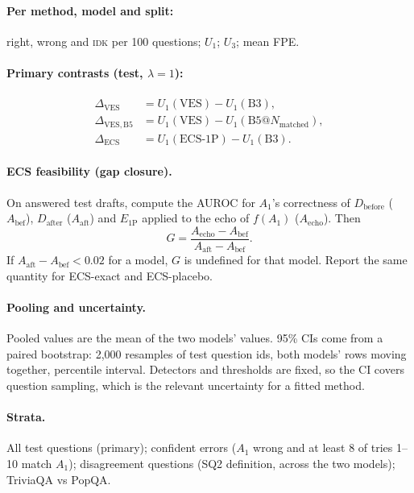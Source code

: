\documentclass[11pt]{article}
\newcommand{\IDK}{\textsc{idk}}
\begin{document}
\paragraph{Per method, model and split:} right, wrong and \IDK{} per 100 questions; $U_1$; $U_3$; mean FPE.

\paragraph{Primary contrasts (test, $\lambda = 1$):}
\begin{align*}
\Delta_{\mathrm{VES}} &= U_1(\mathrm{VES}) - U_1(\mathrm{B3}), \\
\Delta_{\mathrm{VES,B5}} &= U_1(\mathrm{VES}) - U_1(\mathrm{B5}@N_{\mathrm{matched}}), \\
\Delta_{\mathrm{ECS}} &= U_1(\mathrm{ECS\text{-}1P}) - U_1(\mathrm{B3}).
\end{align*}

\paragraph{ECS feasibility (gap closure).} On answered test drafts, compute the AUROC for $A_1$'s correctness
of $D_{\mathrm{before}}$ ($A_{\mathrm{bef}}$), $D_{\mathrm{after}}$ ($A_{\mathrm{aft}}$) and
$E_{\mathrm{1P}}$ applied to the echo of $f(A_1)$ ($A_{\mathrm{echo}}$). Then
\[
G = \frac{A_{\mathrm{echo}} - A_{\mathrm{bef}}}{A_{\mathrm{aft}} - A_{\mathrm{bef}}}.
\]
If $A_{\mathrm{aft}} - A_{\mathrm{bef}} < 0.02$ for a model, $G$ is undefined for that model. Report the same
quantity for ECS-exact and ECS-placebo.

\paragraph{Pooling and uncertainty.} Pooled values are the mean of the two models' values. 95\% CIs come from a
paired bootstrap: 2,000 resamples of test question ids, both models' rows moving together, percentile interval.
Detectors and thresholds are fixed, so the CI covers question sampling, which is the relevant uncertainty for a
fitted method.

\paragraph{Strata.} All test questions (primary); confident errors ($A_1$ wrong and at least 8 of tries 1--10
match $A_1$); disagreement questions (SQ2 definition, across the two models); TriviaQA vs PopQA.
\end{document}
